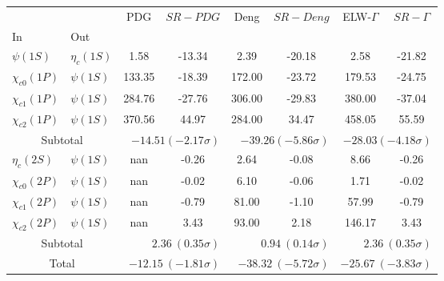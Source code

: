 \begin{tabular}{|l|l|c|c|c|c|c|c|}%
\hline%
&&PDG&$SR-PDG$&Deng&$SR-Deng$&ELW-$\Gamma$&$SR-\Gamma$\\%
In&Out&&&&&&\\%
\hline%
$\psi(1S)$&$\eta_{c}(1S)$&1.58&-13.34&2.39&-20.18&2.58&-21.82\\%
$\chi_{c0}(1P)$&$\psi(1S)$&133.35&-18.39&172.00&-23.72&179.53&-24.75\\%
$\chi_{c1}(1P)$&$\psi(1S)$&284.76&-27.76&306.00&-29.83&380.00&-37.04\\%
$\chi_{c2}(1P)$&$\psi(1S)$&370.56&44.97&284.00&34.47&458.05&55.59\\%
\hline%
\hline%
\multicolumn{2}{|c|}{Subtotal}&\multicolumn{2}{|r|}{$-14.51 (-2.17\sigma)$}&\multicolumn{2}{|r|}{$-39.26 (-5.86\sigma)$}&\multicolumn{2}{|r|}{$-28.03 (-4.18\sigma)$}\\%
\hline%
\hline%
$\eta_{c}(2S)$&$\psi(1S)$&nan&-0.26&2.64&-0.08&8.66&-0.26\\%
$\chi_{c0}(2P)$&$\psi(1S)$&nan&-0.02&6.10&-0.06&1.71&-0.02\\%
$\chi_{c1}(2P)$&$\psi(1S)$&nan&-0.79&81.00&-1.10&57.99&-0.79\\%
$\chi_{c2}(2P)$&$\psi(1S)$&nan&3.43&93.00&2.18&146.17&3.43\\%
\hline%
\hline%
\multicolumn{2}{|c|}{Subtotal}&\multicolumn{2}{|r|}{$2.36~(0.35\sigma)$}&\multicolumn{2}{|r|}{$0.94~(0.14\sigma)$}&\multicolumn{2}{|r|}{$2.36~(0.35\sigma)$}\\%
\hline%
\hline%
\multicolumn{2}{|c|}{Total}&\multicolumn{2}{|r|}{$-12.15~(-1.81\sigma)$}&\multicolumn{2}{|r|}{$-38.32~(-5.72\sigma)$}&\multicolumn{2}{|r|}{$-25.67~(-3.83\sigma)$}\\%
\hline%
\end{tabular}